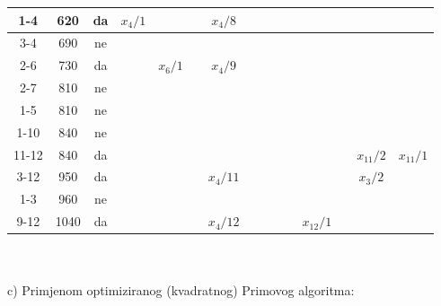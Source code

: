 \documentclass[12pt]{article}
\begin{document}
\begin{enumerate}
{\begin{tabular}{|c|c|c|c|c|c|c|c|c|c|c|c|c|c|c|}
1-4   & 620    & da    & $x_4/1$ &         &         & $x_4/8$  &            &         &         &         &            &            &            &            \\ \hline
3-4   & 690    & ne    &         &         &         &          &            &         &         &         &            &            &            &            \\ \hline
2-6   & 730    & da    &         & $x_6/1$ &         & $x_4/9$  &            &         &         &         &            &            &            &            \\ \hline
2-7   & 810    & ne    &         &         &         &          &            &         &         &         &            &            &            &            \\ \hline
1-5   & 810    & ne    &         &         &         &          &            &         &         &         &            &            &            &            \\ \hline
1-10  & 840    & ne    &         &         &         &          &            &         &         &         &            &            &            &            \\ \hline
11-12 & 840    & da    &         &         &         &          &            &         &         &         &            &            & $x_{11}/2$ & $x_{11}/1$ \\ \hline
3-12  & 950    & da    &         &         &         & $x_4/11$ &            &         &         &         &            &            & $x_3/2$    &            \\ \hline
1-3   & 960    & ne    &         &         &         &          &            &         &         &         &            &            &            &            \\ \hline
9-12  & 1040   & da    &         &         &         & $x_4/12$ &            &         &         &         & $x_{12}/1$ &            &            &            \\ \hline
\end{tabular}
	}
	\\
	\\
	c) Primjenom optimiziranog (kvadratnog) Primovog algoritma: \\
	\newpage
\end{enumerate}
\end{document}
